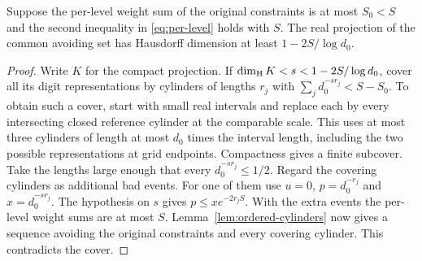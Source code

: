 \begin{lemma}\label{lem:dimension-by-coverage}
Suppose the per-level weight sum of the original constraints is at most $S_0<S$ and the second inequality in \eqref{eq:per-level} holds with $S$. The real projection of the common avoiding set has Hausdorff dimension at least $1-2S/\log d_0$.
\end{lemma}

\begin{proof}
Write $K$ for the compact projection. If $\dim_{\rm H}K<s<1-2S/\log d_0$, cover all its digit representations by cylinders of lengths $r_j$ with $\sum_j d_0^{-s r_j}<S-S_0$. To obtain such a cover, start with small real intervals and replace each by every intersecting closed reference cylinder at the comparable scale. This uses at most three cylinders of length at most $d_0$ times the interval length, including the two possible representations at grid endpoints. Compactness gives a finite subcover. Take the lengths large enough that every $d_0^{-s r_j}\le1/2$. Regard the covering cylinders as additional bad events. For one of them use $u=0$, $p=d_0^{-r_j}$ and $x=d_0^{-s r_j}$. The hypothesis on $s$ gives $p\le x e^{-2r_j S}$. With the extra events the per-level weight sums are at most $S$. Lemma~\ref{lem:ordered-cylinders} now gives a sequence avoiding the original constraints and every covering cylinder. This contradicts the cover.
\end{proof}

